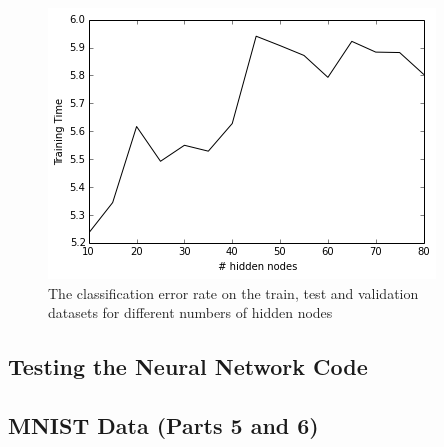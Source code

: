 \documentclass[10pt]{article}
\begin{document}
\begin{figure}
\centering
\includegraphics[scale=0.5]{SGD_toy_data_2_training_time.png}
\caption{The classification error rate on the train, test and validation datasets for different numbers of hidden nodes}
\label{SGD_toy_data_2_training_time}
\end{figure}

\subsection*{Testing the Neural Network Code}



\subsection*{MNIST Data (Parts 5 and 6)}
\end{document}

